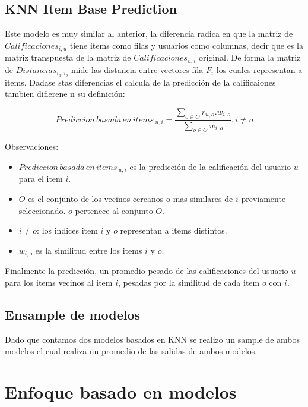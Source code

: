 \documentclass[11pt,a4paper,twoside]{thesis}
\begin{document}
\subsection{KNN Item Base Prediction}

Este modelo es muy similar al anterior, la diferencia radica en que la matriz de $Calificaciones_{i, u}$ tiene items como filas y usuarios como columnas, decir que es la matriz transpuesta de la matriz de $Calificaciones_{u, i}$ original. De forma la matriz de $Distancias_{i_a,i_b}$ mide las distancia entre vectores fila $F_i$ los cuales representan a items. Dadase stas diferencias el calcula de la predicción de la calificaiones tambien difierene n su definición:


\begin{equation*}
	Prediccion \mspace{3mu}basada \mspace{3mu}en \mspace{3mu}items\mspace{3mu}_{u, i} = \frac{\sum_{o \in O} r_{u, o}. w_{i, o} }{\sum_{o \in O} w_{i, o} }, i \neq o
\end{equation*}
\begin{description}
	\item[Observaciones:]
\end{description}
\begin{itemize}
	\item $Prediccion \mspace{3mu}basada \mspace{3mu}en \mspace{3mu}items\mspace{3mu}_{u, i}$ es la predicción de la calificación del usuario $u$ para el item $i$.
	\item $O$ es el conjunto de los vecinos cercanos o mas similares de $i$ previamente seleccionado. $o$ pertenece al conjunto $O$.
	\item $i \neq o$: los indices item $i$ y $o$ representan a items distintos. 
	\item $w_{i,o}$ es la similitud entre los items $i$ y $o$.
\end{itemize}

Finalmente la predicción, un promedio pesado de las calificaciones del usuario $u$ para los items vecinos al item $i$, pesadas por la similitud de cada item $o$ con $i$.

\subsection{Ensample de modelos}

Dado que contamos dos modelos basados en KNN se realizo un sample de ambos modelos el cual realiza un promedio de las salidas de ambos modelos.


\section{Enfoque basado en modelos}
\end{document}
